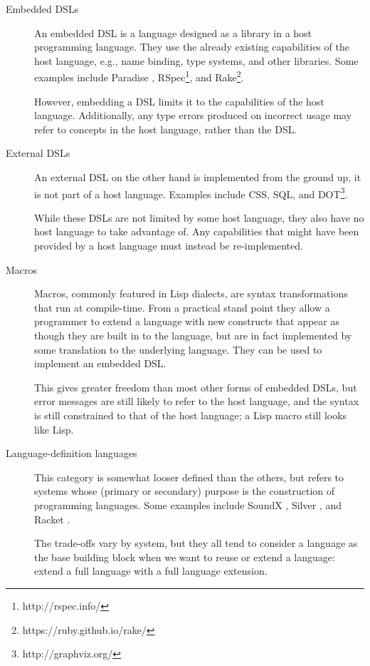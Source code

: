 \documentclass{kththesis}
\begin{document}
\begin{description}
  \item[Embedded DSLs] An embedded DSL is a language designed as a library in a host programming language. They use the already existing capabilities of the host language, e.g., name binding, type systems, and other libraries. Some examples include Paradise \cite{Augustsson2008Paradise:-A-Two}, RSpec\footnote{http://rspec.info/}, and Rake\footnote{https://ruby.github.io/rake/}.

  However, embedding a DSL limits it to the capabilities of the host language. Additionally, any type errors produced on incorrect usage may refer to concepts in the host language, rather than the DSL.

  \item[External DSLs] An external DSL on the other hand is implemented from the ground up, it is not part of a host language. Examples include CSS, SQL, and DOT\footnote{http://graphviz.org/}.

  While these DSLs are not limited by some host language, they also have no host language to take advantage of. Any capabilities that might have been provided by a host language must instead be re-implemented.

  \item[Macros] Macros, commonly featured in Lisp dialects, are syntax transformations that run at compile-time. From a practical stand point they allow a programmer to extend a language with new constructs that appear as though they are built in to the language, but are in fact implemented by some translation to the underlying language. They can be used to implement an embedded DSL.

  This gives greater freedom than most other forms of embedded DSLs, but error messages are still likely to refer to the host language, and the syntax is still constrained to that of the host language; a Lisp macro still looks like Lisp.

  \item[Language-definition languages] This category is somewhat looser defined than the others, but refers to systems whose (primary or secondary) purpose is the construction of programming languages. Some examples include SoundX \cite{Lorenzen2016Sound-type-depe}, Silver \cite{Van-Wyk2010Silver:-An-exte}, and Racket \cite{Tobin-Hochstadt:2011:LL:1993498.1993514}.

  The trade-offs vary by system, but they all tend to consider a language as the base building block when we want to reuse or extend a language: extend a full language with a full language extension.
\end{description}
\end{document}
